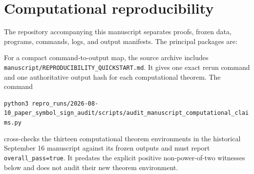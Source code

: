 \section{Computational reproducibility}\label{sec:reproducibility}

The repository accompanying this manuscript separates proofs, frozen data,
programs, commands, logs, and output manifests.  The principal packages are:

For a compact command-to-output map, the source archive includes
\nolinkurl{manuscript/REPRODUCIBILITY_QUICKSTART.md}.  It gives one exact
rerun command and one authoritative output hash for each computational
theorem.  The command
\begin{center}
\small\texttt{python3 }\nolinkurl{repro_runs/2026-08-10_paper_symbol_sign_audit/scripts/audit_manuscript_computational_claims.py}
\end{center}
cross-checks the thirteen computational theorem environments in the
historical September 16 manuscript against its frozen outputs and must
report \nolinkurl{overall_pass=true}. It predates the explicit positive
non-power-of-two witnesses below and does not audit their new theorem
environment.



